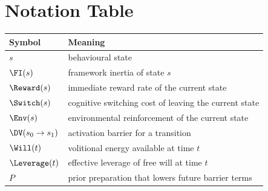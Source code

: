 \section{Notation Table}

\begin{center}
\begin{tabularx}{\textwidth}{@{}l X@{}}
\toprule
Symbol & Meaning \\
\midrule
$s$ & behavioural state \\
$\FI(s)$ & framework inertia of state $s$ \\
$\Reward(s)$ & immediate reward rate of the current state \\
$\Switch(s)$ & cognitive switching cost of leaving the current state \\
$\Env(s)$ & environmental reinforcement of the current state \\
$\DV(s_0 \to s_1)$ & activation barrier for a transition \\
$\Will(t)$ & volitional energy available at time $t$ \\
$\Leverage(t)$ & effective leverage of free will at time $t$ \\
$P$ & prior preparation that lowers future barrier terms \\
\bottomrule
\end{tabularx}
\end{center}
